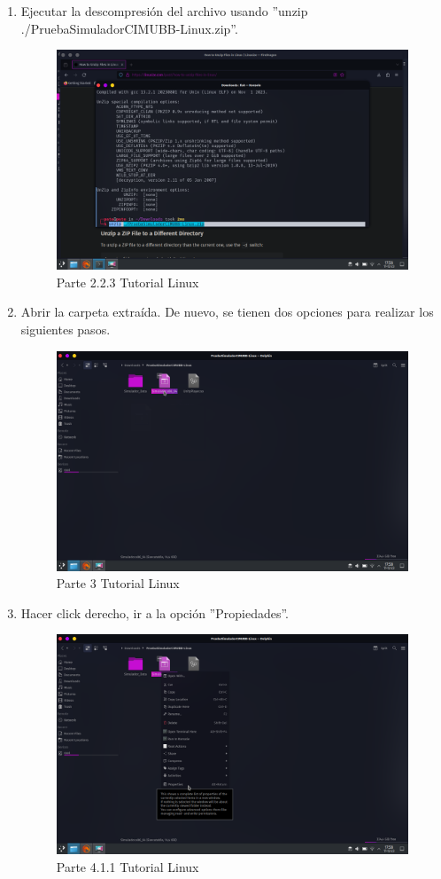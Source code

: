 \begin{enumerate}[label=\arabic*.-]
    \item Ejecutar la descompresión del archivo usando ''unzip ./PruebaSimuladorCIMUBB-Linux.zip''.
\begin{figure}[ht]
    \centering
    \includegraphics[width=10.5cm]{figures/TutorialLinux/tutoriallinux (5).png}
    \caption{Parte 2.2.3 Tutorial Linux}
    \label{fig:tutolinux5}
\end{figure}

    \item Abrir la carpeta extraída. De nuevo, se tienen dos opciones para realizar los siguientes pasos.
\begin{figure}[ht]
    \centering
    \includegraphics[width=10.5cm]{figures/TutorialLinux/tutoriallinux (6).png}
    \caption{Parte 3 Tutorial Linux}
    \label{fig:tutolinux6}
\end{figure}
\clearpage

    \item Hacer click derecho, ir a la opción ''Propiedades''.
\begin{figure}[ht]
    \centering
    \includegraphics[width=10.5cm]{figures/TutorialLinux/tutoriallinux (7).png}
    \caption{Parte 4.1.1 Tutorial Linux}
    \label{fig:tutolinux7}
\end{figure}


\end{enumerate}
